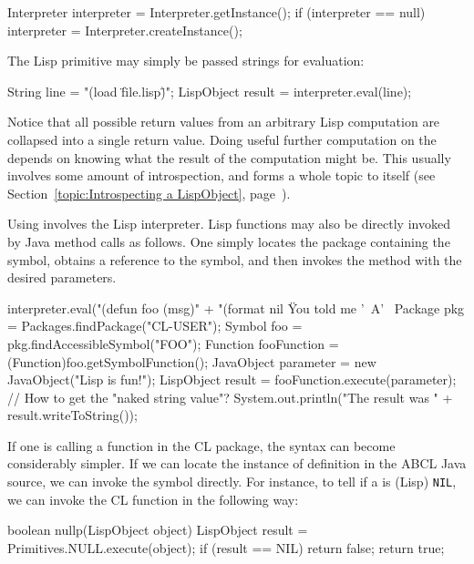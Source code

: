 \documentclass[10pt]{book}
\begin{document}
\begin{listing-java}
  Interpreter interpreter = Interpreter.getInstance();
  if (interpreter == null) {
    interpreter = Interpreter.createInstance();
  }
\end{listing-java}


The Lisp  primitive may simply be passed strings for evaluation:

\begin{listing-java}
  String line = "(load \"file.lisp\")";
  LispObject result = interpreter.eval(line);
\end{listing-java}

Notice that all possible return values from an arbitrary Lisp
computation are collapsed into a single return value.  Doing useful
further computation on the  depends on knowing what the
result of the computation might be.  This usually involves some amount
of  introspection, and forms a whole topic to itself
(see Section~\ref{topic:Introspecting a LispObject},
page~\pageref{topic:Introspecting a LispObject}).

Using  involves the Lisp interpreter.  Lisp functions may
also be directly invoked by Java method calls as follows.  One simply
locates the package containing the symbol, obtains a reference to the
symbol, and then invokes the  method with the desired
parameters.

\begin{listing-java}
  interpreter.eval("(defun foo (msg)" +
    "(format nil \"You told me '~A'~%
  Package pkg = Packages.findPackage("CL-USER");
  Symbol foo = pkg.findAccessibleSymbol("FOO"); 
  Function fooFunction = (Function)foo.getSymbolFunction();
  JavaObject parameter = new JavaObject("Lisp is fun!");
  LispObject result = fooFunction.execute(parameter);
  // How to get the "naked string value"?
  System.out.println("The result was " + result.writeToString()); 
\end{listing-java}

If one is calling a function in the CL package, the syntax can become
considerably simpler.  If we can locate the instance of definition in
the ABCL Java source, we can invoke the symbol directly.  For instance,
to tell if a  is (Lisp) \texttt{NIL}, we can invoke the
CL function  in the following way:


\begin{listing-java}
  boolean nullp(LispObject object) {
    LispObject result = Primitives.NULL.execute(object);
    if (result == NIL) { 
      return false;
    }
    return true;
 }
\end{listing-java}
\end{document}
